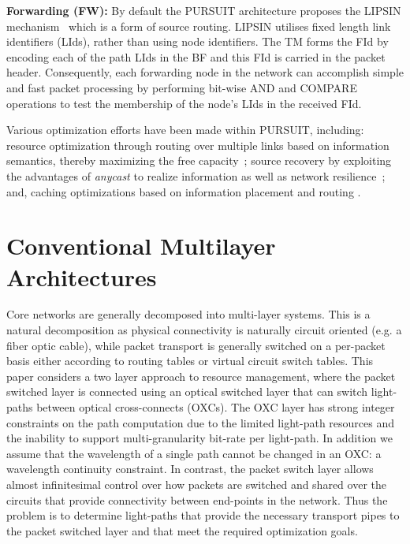 \documentclass[journal]{IEEEtran}
\begin{document}
\textbf{Forwarding (FW):} By default the PURSUIT architecture proposes
the LIPSIN mechanism~\cite{pet:ICnet} which is a form of source
routing. LIPSIN utilises
fixed length link identifiers (LIds), rather than using node
identifiers. The TM forms the FId by encoding each of the path LIds in
the BF and this FId is carried in the packet header. Consequently, each forwarding node in the network can
accomplish simple and fast packet processing by performing bit-wise AND and COMPARE operations to test the membership of the node's LIds in the received FId.

Various optimization efforts have been made within PURSUIT, including:
resource optimization through routing over multiple links based on information semantics, thereby maximizing the free
capacity~\cite{mjr:te}; source recovery by exploiting the advantages
of \emph{anycast} to realize information as well as network
resilience~\cite{nad:ICnet}; and, caching optimizations based on
information placement and routing \cite{sou2:zipf}.

\section{Conventional Multilayer Architectures}\label{sec:ml}
Core networks are generally decomposed into multi-layer systems. This
is a natural decomposition as physical connectivity is naturally
circuit oriented (e.g. a fiber optic cable), while packet transport is
generally switched on a per-packet basis either according to routing
tables or virtual circuit switch tables. This paper considers a two layer approach to resource management, where the packet switched layer is connected using an optical switched layer that can switch light-paths between optical cross-connects (OXCs). The OXC layer has strong integer constraints on the path computation due to the limited light-path resources and the inability to support multi-granularity bit-rate per light-path. In addition we assume that the wavelength of a single path cannot be changed in an OXC: a wavelength continuity constraint. In contrast, the packet switch layer allows almost infinitesimal control over how packets are switched and shared over the circuits that provide connectivity between end-points in the network. Thus the problem is to determine light-paths that provide the necessary transport pipes to the packet switched layer and that meet the required optimization goals. 
\end{document}
